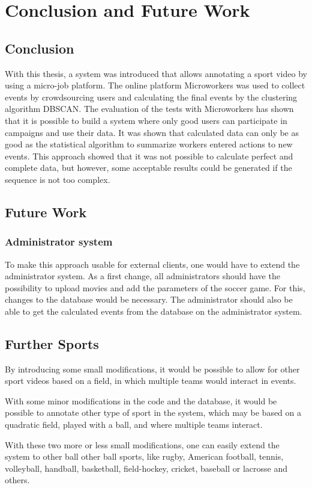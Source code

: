 \chapter{Conclusion and Future Work}


\section{Conclusion}
With this thesis, a system was introduced that allows annotating a sport video by using a micro-job platform. The online platform Microworkers was used to collect events by crowdsourcing users and calculating the final events by the clustering algorithm DBSCAN.
The evaluation of the tests with Microworkers has shown that it is possible to build a system where only good users can participate in campaigns and use their data.
It was shown that calculated data can only be as good as the statistical algorithm to summarize workers entered actions to new events. This approach showed that it was not possible to calculate perfect and complete data, but however, some acceptable results could be generated if the sequence is not too complex.


\section{Future Work}

\subsection{Administrator system}
To make this approach usable for external clients, one would have to extend the administrator system.
As a first change, all administrators should have the possibility to upload movies and add the parameters of the soccer game. For this, changes to the database would be necessary.
The administrator should also be able to get the calculated events from the database on the administrator system.

\section{Further Sports}

By introducing some small modifications, it would be possible to allow for other sport videos based on a field, in which multiple teams would interact in events.

With some minor modifications in the code and the database, it would be possible to annotate other type of sport in the system, which may be based on a quadratic field, played with a ball, and where multiple teams interact.


With these two more or less small modifications, one can easily extend the system to other ball other ball sports, like rugby, American football, tennis, volleyball, handball, basketball, field-hockey, cricket, baseball or lacrosse and others.


